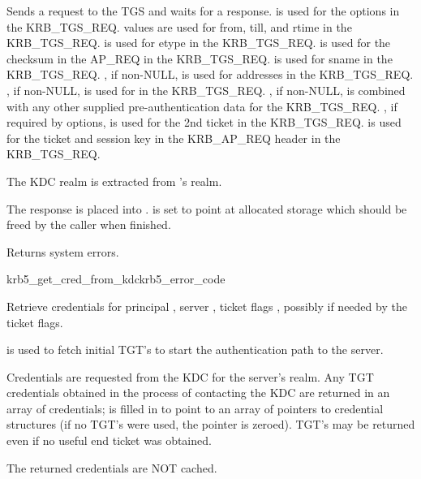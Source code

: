 \internalfunc

Sends a request to the TGS and waits for a response.
 is used for the options in the KRB_TGS_REQ.
 values are used for from, till, and rtime in the
KRB_TGS_REQ.
 is used for etype in the KRB_TGS_REQ.
 is used for the checksum in the AP_REQ in the KRB_TGS_REQ.
 is used for sname in the KRB_TGS_REQ.
, if non-NULL, is used for addresses in the KRB_TGS_REQ.
, if non-NULL, is used for
 in the KRB_TGS_REQ.  
, if non-NULL, is combined with any other supplied
pre-authentication data for the KRB_TGS_REQ.
, if required by options, is used for the 2nd
ticket in the KRB_TGS_REQ.
 is used for the ticket and session key in the KRB_AP_REQ header in the KRB_TGS_REQ.

The KDC realm is extracted from 's realm.

The response is placed into .
 is set to point at allocated storage
which should be freed by the caller when finished.

Returns system errors.

\begin{funcdecl}{krb5_get_cred_from_kdc}{krb5_error_code}{\funcin}
\funcinout
{}
\funcout			
{}
\end{funcdecl}

Retrieve credentials for principal ,
server ,
ticket flags , possibly
 if needed by the ticket flags.

 is used to fetch initial TGT's to start the authentication
path to the server.

Credentials are requested from the KDC for the server's realm.  Any
TGT credentials obtained in the process of contacting the KDC are
returned in an array of credentials;  is filled in to
point to an array of pointers to credential structures (if no TGT's were
used, the pointer is zeroed).  TGT's may be returned even if no useful
end ticket was obtained.

The returned credentials are NOT cached.

